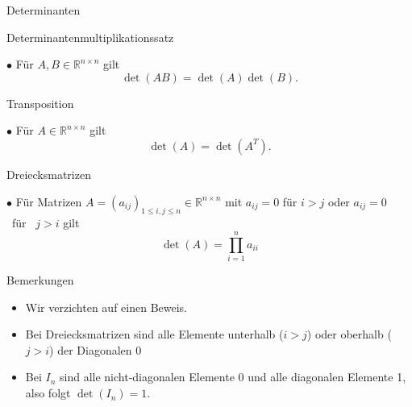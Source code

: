 \documentclass[
  8pt,
  ignorenonframetext,
]{beamer}
\providecommand{\tightlist}{%
  \setlength{\itemsep}{0pt}\setlength{\parskip}{0pt}}
\begin{document}
\begin{frame}{Determinanten}
\protect\hypertarget{determinanten-5}{}
\footnotesize
\begin{theorem}
\normalfont
Determinantenmultiplikationssatz

$\bullet$ Für $A,B \in \mathbb{R}^{n \times n}$ gilt
\begin{equation}
\det(AB) = \det(A)\det(B).
\end{equation}

Transposition

$\bullet$ Für $A \in \mathbb{R}^{n \times n}$ gilt
\begin{equation}
\det(A) = \det\left(A^T\right).
\end{equation}

Dreiecksmatrizen

$\bullet$ Für Matrizen
$A = (a_{ij})_{1 \le i,j\le n} \in \mathbb{R}^{n \times n}$
mit $a_{ij} = 0$ für $i > j$ oder $a_{ij} = 0$ \mbox{ für } $j > i$ gilt
\begin{equation}
\det(A) = \prod_{i=1}^n a_{ii}
\end{equation}
\end{theorem}
\footnotesize

Bemerkungen

\begin{itemize}
\tightlist
\item
  Wir verzichten auf einen Beweis.
\item
  Bei Dreiecksmatrizen sind alle Elemente unterhalb (\(i > j\)) oder
  oberhalb (\(j > i\)) der Diagonalen 0
\item
  Bei \(I_n\) sind alle nicht-diagonalen Elemente 0 und alle diagonalen
  Elemente 1, also folgt \(\det(I_n) = 1\).
\end{itemize}
\end{frame}
\end{document}

